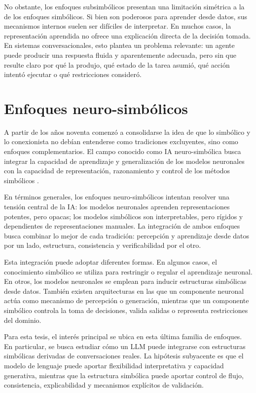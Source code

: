 No obstante, los enfoques subsimbólicos presentan una limitación simétrica a la de los
enfoques simbólicos. Si bien son poderosos para aprender desde datos, sus mecanismos
internos suelen ser difíciles de interpretar. En muchos casos, la representación aprendida
no ofrece una explicación directa de la decisión tomada. En sistemas conversacionales,
esto plantea un problema relevante: un agente puede producir una respuesta fluida y
aparentemente adecuada, pero sin que resulte claro por qué la produjo, qué estado de
la tarea asumió, qué acción intentó ejecutar o qué restricciones consideró.

\section{Enfoques neuro-simbólicos}

A partir de los años noventa comenzó a consolidarse la idea de que lo simbólico y lo
conexionista no debían entenderse como tradiciones excluyentes, sino como enfoques
complementarios. El campo conocido como \ac{IA} neuro-simbólica busca integrar la
capacidad de aprendizaje y generalización de los modelos neuronales con la capacidad
de representación, razonamiento y control de los métodos simbólicos
\citep{garcez2002neural,besold2017neural,garcez2019neural,garcez2020neuro}.

En términos generales, los enfoques neuro-simbólicos intentan resolver una tensión
central de la \ac{IA}: los modelos neuronales aprenden representaciones potentes, pero
opacas; los modelos simbólicos son interpretables, pero rígidos y dependientes de
representaciones manuales. La integración de ambos enfoques busca combinar lo mejor
de cada tradición: percepción y aprendizaje desde datos por un lado, estructura,
consistencia y verificabilidad por el otro.

Esta integración puede adoptar diferentes formas. En algunos casos, el conocimiento
simbólico se utiliza para restringir o regular el aprendizaje neuronal. En otros, los
modelos neuronales se emplean para inducir estructuras simbólicas desde datos. También
existen arquitecturas en las que un componente neuronal actúa como mecanismo de
percepción o generación, mientras que un componente simbólico controla la toma de
decisiones, valida salidas o representa restricciones del dominio.

Para esta tesis, el interés principal se ubica en esta última familia de enfoques. En
particular, se busca estudiar cómo un \ac{LLM} puede integrarse con estructuras simbólicas
derivadas de conversaciones reales. La hipótesis subyacente es que el modelo de lenguaje
puede aportar flexibilidad interpretativa y capacidad generativa, mientras que la
estructura simbólica puede aportar control de flujo, consistencia, explicabilidad y
mecanismos explícitos de validación.

